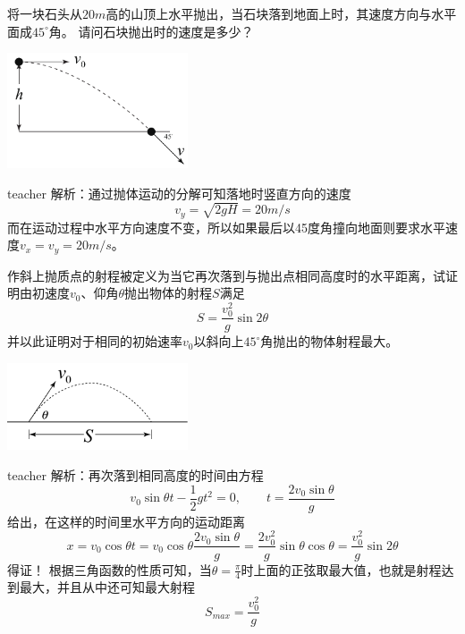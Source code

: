 \begin{example}
将一块石头从$20\unit{m}$高的山顶上水平抛出，当石块落到地面上时，其速度方向与水平面成$45^\circ$角。
请问石块抛出时的速度是多少？
\begin{flushright}
\includegraphics[width = 0.4\textwidth]{images/motion-32.pdf} 
\end{flushright}
\begin{taggedblock}{teacher}
\noindent
解析：通过抛体运动的分解可知落地时竖直方向的速度
\[
v_y = \sqrt{2gH} = 20\unit{m/s}
\]
而在运动过程中水平方向速度不变，所以如果最后以45度角撞向地面则要求水平速度$v_x = v_y = 20\unit{m/s} $。
\end{taggedblock}
\end{example}


\begin{example}
作斜上抛质点的射程被定义为当它再次落到与抛出点相同高度时的水平距离，试证明由初速度$v_0$、仰角$\theta$抛出物体的射程$S$满足
\[ S = \frac{v_0^2}{g}\sin 2\theta \]
并以此证明对于相同的初始速率$v_0$以斜向上$45^\circ$角抛出的物体射程最大。
\begin{flushright}
\includegraphics[width=0.4\textwidth]{images/motion-problem-2.pdf}
\end{flushright}
\begin{taggedblock}{teacher}
\noindent
解析：再次落到相同高度的时间由方程
\[
v_0\sin\theta t-\frac{1}{2}gt^2=0,\qquad t = \frac{2v_0\sin\theta}{g}
\]
给出，在这样的时间里水平方向的运动距离
\[
x = v_0\cos\theta t = v_0\cos\theta  \frac{2v_0\sin\theta}{g} = \frac{2v_0^2}{g}\sin\theta\cos\theta = \frac{v_0^2}{g}\sin 2\theta
\]
得证！
根据三角函数的性质可知，当$\theta = \frac{\pi}{4}$时上面的正弦取最大值，也就是射程达到最大，并且从中还可知最大射程
\[
S_{max} = \frac{v_0^2}{g}
\]
\end{taggedblock}
\end{example}

